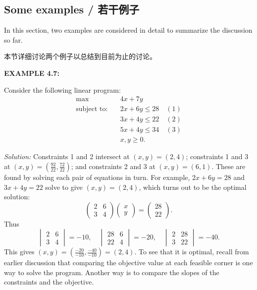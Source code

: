 \subsection{Some examples / 若干例子}

\begin{original}
In this section, two examples are considered in detail to summarize the discussion so far.
\end{original}
\begin{translation}
本节详细讨论两个例子以总结到目前为止的讨论。
\end{translation}

\bigskip
\noindent\textbf{EXAMPLE 4.7:}
\begin{original}
Consider the following linear program:
\[
\begin{aligned}
\max \quad & 4x + 7y \\
\text{subject to:} \quad & 2x + 6y \le 28 \quad (1) \\
& 3x + 4y \le 22 \quad (2) \\
& 5x + 4y \le 34 \quad (3) \\
& x, y \ge 0.
\end{aligned}
\]

\noindent\textit{Solution:} Constraints 1 and 2 intersect at $(x, y) = (2,4)$; constraints 1 and 3 at $(x, y) = \left(\frac{92}{22}, \frac{72}{22}\right)$; and constraints 2 and 3 at $(x, y) = (6,1)$. These are found by solving each pair of equations in turn. For example, $2x + 6y = 28$ and $3x + 4y = 22$ solve to give $(x, y) = (2,4)$, which turns out to be the optimal solution:
\[
\begin{pmatrix} 2 & 6 \\ 3 & 4 \end{pmatrix} \begin{pmatrix} x \\ y \end{pmatrix} = \begin{pmatrix} 28 \\ 22 \end{pmatrix}.
\]
Thus
\[
\begin{vmatrix} 2 & 6 \\ 3 & 4 \end{vmatrix} = -10,\quad
\begin{vmatrix} 28 & 6 \\ 22 & 4 \end{vmatrix} = -20,\quad
\begin{vmatrix} 2 & 28 \\ 3 & 22 \end{vmatrix} = -40.
\]
This gives $(x, y) = \left(\frac{-20}{-10}, \frac{-40}{-10}\right) = (2,4)$. To see that it is optimal, recall from earlier discussion that comparing the objective value at each feasible corner is one way to solve the program. Another way is to compare the slopes of the constraints and the objective.


\end{original}
